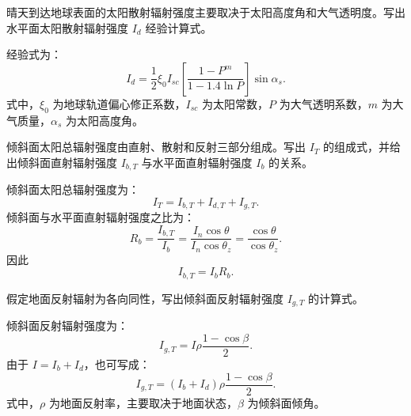\begin{problem}[水平面散射辐射强度]\label{exer:calc_04_solar_p032_01}
晴天到达地球表面的太阳散射辐射强度主要取决于太阳高度角和大气透明度。写出水平面太阳散射辐射强度 \(I_d\) 经验计算式。
\end{problem}

\begin{solution}
经验式为：
\begin{equation}
I_d
= \frac{1}{2}\xi_0 I_{sc}
\left[\frac{1 - P^m}{1 - 1.4\ln P}\right]\sin\alpha_s.
\end{equation}
式中，\(\xi_0\) 为地球轨道偏心修正系数，\(I_{sc}\) 为太阳常数，\(P\) 为大气透明系数，\(m\) 为大气质量，\(\alpha_s\) 为太阳高度角。
\end{solution}

\begin{problem}[倾斜面直射辐射强度]\label{exer:calc_04_solar_p033_01}
倾斜面太阳总辐射强度由直射、散射和反射三部分组成。写出 \(I_T\) 的组成式，并给出倾斜面直射辐射强度 \(I_{b,T}\) 与水平面直射辐射强度 \(I_b\) 的关系。
\end{problem}

\begin{solution}
倾斜面太阳总辐射强度为：
\begin{equation}
I_T = I_{b,T} + I_{d,T} + I_{g,T}.
\end{equation}
倾斜面与水平面直射辐射强度之比为：
\begin{equation}
R_b = \frac{I_{b,T}}{I_b}
= \frac{I_n\cos\theta}{I_n\cos\theta_z}
= \frac{\cos\theta}{\cos\theta_z}.
\end{equation}
因此
\begin{equation}
I_{b,T} = I_b R_b.
\end{equation}
\end{solution}

\begin{problem}[倾斜面反射辐射强度]\label{exer:calc_04_solar_p034_01}
假定地面反射辐射为各向同性，写出倾斜面反射辐射强度 \(I_{g,T}\) 的计算式。
\end{problem}

\begin{solution}
倾斜面反射辐射强度为：
\begin{equation}
I_{g,T}
= I\rho\frac{1-\cos\beta}{2}.
\end{equation}
由于 \(I = I_b + I_d\)，也可写成：
\begin{equation}
I_{g,T}
= (I_b + I_d)\rho\frac{1-\cos\beta}{2}.
\end{equation}
式中，\(\rho\) 为地面反射率，主要取决于地面状态，\(\beta\) 为倾斜面倾角。
\end{solution}

